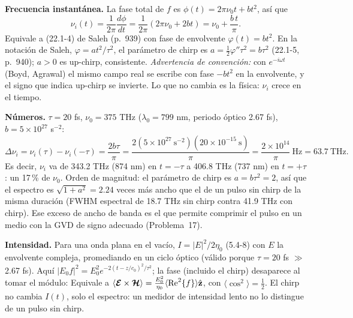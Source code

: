  \textbf{Frecuencia instantánea.} La fase total de $f$ es $\phi(t)=2\pi\nu_0t+bt^2$, así que
\begin{equation*}
\nu_i(t)=\frac{1}{2\pi}\frac{d\phi}{dt}=\frac{1}{2\pi}(2\pi\nu_0+2bt)=\nu_0+\frac{b\,t}{\pi}.
\end{equation*}
Equivale a (22.1-4) de Saleh (p.~939) con fase de envolvente $\varphi(t)=bt^2$.
En la notación de Saleh, $\varphi=at^2/\tau^2$, el parámetro de chirp es $a=\tfrac12\varphi''\tau^2=b\tau^2$ (22.1-5, p.~940);
$a>0$ es up-chirp, consistente. \emph{Advertencia de convención:} con $e^{-i\omega t}$ (Boyd, Agrawal) el mismo campo real
se escribe con fase $-bt^2$ en la envolvente, y el signo que indica up-chirp se invierte. Lo que no cambia es la física:
$\nu_i$ crece en el tiempo.

 \textbf{Números.} $\tau=20$ fs, $\nu_0=375$ THz ($\lambda_0=799$ nm, periodo óptico 2.67 fs), $b=5\times10^{27}$ s$^{-2}$:
\begin{equation*}
\Delta\nu_i=\nu_i(\tau)-\nu_i(-\tau)=\frac{2b\tau}{\pi}=\frac{2(5\times10^{27}\ \mathrm{s^{-2}})(20\times10^{-15}\ \mathrm s)}{\pi}
=\frac{2\times10^{14}}{\pi}\ \mathrm{Hz}=63.7\ \mathrm{THz}.
\end{equation*}
Es decir, $\nu_i$ va de 343.2 THz (874 nm) en $t=-\tau$ a 406.8 THz (737 nm) en $t=+\tau$: un 17\,\% de $\nu_0$.
Orden de magnitud: el parámetro de chirp es $a=b\tau^2=2$, así que el espectro es $\sqrt{1+a^2}=2.24$ veces más ancho que
el de un pulso sin chirp de la misma duración (FWHM espectral de 18.7 THz sin chirp contra 41.9 THz con chirp). Ese
exceso de ancho de banda es el que permite comprimir el pulso en un medio con la GVD de signo adecuado (Problema~17).

 \textbf{Intensidad.} Para una onda plana en el vacío, $I=|E|^2/2\eta_0$ (5.4-8) con $E$ la envolvente compleja,
promediando en un ciclo óptico (válido porque $\tau=20$ fs $\gg$ 2.67 fs). Aquí $|E_0f|^2=E_0^2e^{-2(t-z/c_0)^2/\tau^2}$; la
fase (incluido el chirp) desaparece al tomar el módulo:
Equivale a $\langle\boldsymbol{\mathcal E}\times\boldsymbol{\mathcal H}\rangle=\frac{E_0^2}{\eta_0}\langle\mathrm{Re}^2\{f\}\rangle\hat{\mathbf z}$, con
$\langle\cos^2\rangle=\frac12$. El chirp no cambia $I(t)$, solo el espectro: un medidor de intensidad lento no lo distingue
de un pulso sin chirp.

